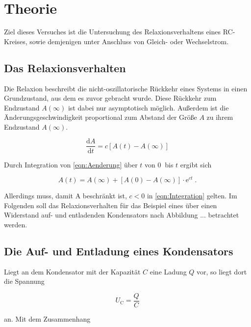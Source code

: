 \section{Theorie}
\label{sec:Theorie}

Ziel dieses Versuches ist die Untersuchung des Relaxionsverhaltens eines RC-Kreises,
sowie demjenigen unter Anschluss von Gleich- oder Wechselstrom. \\

\subsection{Das Relaxionsverhalten}

Die Relaxion beschreibt die nicht-oszillatorische Rückkehr eines Systems in einen
Grundzustand, aus dem es zuvor gebracht wurde. Diese Rückkehr zum Endzustand $A(\infty)$
ist dabei nur asymptotisch möglich. Außerdem ist die Änderungsgeschwindigkeit proportional
zum Abstand der Größe $A$ zu ihrem Endzustand $A(\infty)$.

\begin{equation}
    \frac{\text{d}A}{\text{d}t} = c \left[A(t) - A(\infty) \right]
    \label{eqn:Aenderung}
\end{equation}

Durch Integration von \eqref{eqn:Aenderung} über $t$ von $\SI{0}{}$ bis $t$ ergibt
sich

\begin{equation}
    A(t) = A(\infty) + \left[A(0) - A(\infty) \right] \cdot \text{e}^{ct} \; \text{.}
    \label{eqn:Integration}
\end{equation}

Allerdings muss, damit A beschränkt ist, $c < 0$ in \eqref{eqn:Integration} gelten.
Im Folgenden soll das Relaxionsverhalten für das Beispiel eines über einen Widerstand
auf- und entladenden Kondensators nach Abbildung ... betrachtet werden.

\subsection{Die Auf- und Entladung eines Kondensators}

Liegt an dem Kondensator mit der Kapazität $C$ eine Ladung $Q$ vor, so liegt dort die Spannung 

\begin{equation}
    U_\text{C} = \frac{Q}{C}
\end{equation}

an. Mit dem Zusammenhang

